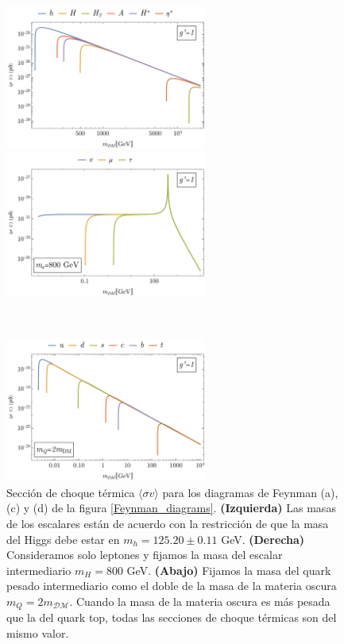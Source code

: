 \begin{figure}[h]
\centering
\begin{minipage}{.5\textwidth}
  \includegraphics[height=1.88in]{Results/sv-a.pdf}
\end{minipage}%
\centering
\begin{minipage}{.5\textwidth}
  \includegraphics[height=1.88in]{Results/sv-c.pdf}
\end{minipage}%
\ \
\centering
\begin{minipage}{\textwidth}
  \centering
  \includegraphics[height=1.88in]{Results/sv-d.pdf}
\end{minipage}%
\caption[\hspace{0.1in}Sección de choque térmica $\langle \sigma v \rangle$]{Sección de choque térmica $\langle \sigma v \rangle$ para los diagramas de Feynman (a), (c) y (d) de la figura \ref{Feynman_diagrams}. \textbf{(Izquierda)} Las masas de los escalares están de acuerdo con la restricción de que la masa del Higgs debe estar en $m_h = 125.20 \pm 0.11$ GeV. \textbf{(Derecha)} Consideramos solo leptones y fijamos la masa del escalar intermediario $m_H=$800 GeV. \textbf{(Abajo)} Fijamos la masa del quark pesado intermediario como el doble de la masa de la materia oscura $m_Q = 2m_\mathcal{DM}$. Cuando la masa de la materia oscura es más pesada que la del quark top, todas las secciones de choque térmicas son del mismo valor. } 
\label{sv}
\end{figure}

